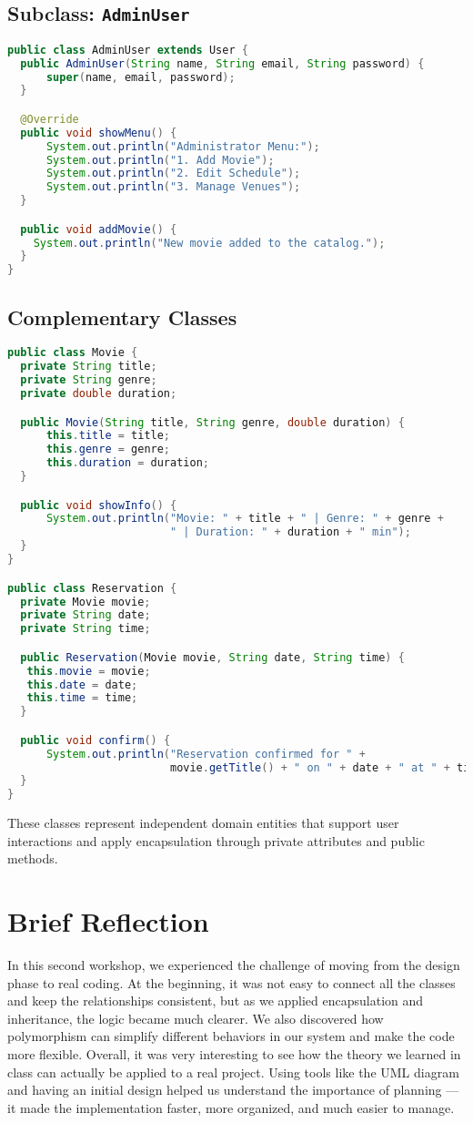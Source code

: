 \documentclass[man]{apa7}
\begin{document}
\subsection{Subclass: \texttt{AdminUser}}
\begin{lstlisting}[language=Java]
public class AdminUser extends User {
  public AdminUser(String name, String email, String password) {
      super(name, email, password);
  }

  @Override
  public void showMenu() {
      System.out.println("Administrator Menu:");
      System.out.println("1. Add Movie");
      System.out.println("2. Edit Schedule");
      System.out.println("3. Manage Venues");
  }

  public void addMovie() {
    System.out.println("New movie added to the catalog.");
  }
}
\end{lstlisting}

\subsection{Complementary Classes}
\begin{lstlisting}[language=Java]
public class Movie {
  private String title;
  private String genre;
  private double duration;

  public Movie(String title, String genre, double duration) {
      this.title = title;
      this.genre = genre;
      this.duration = duration;
  }

  public void showInfo() {
      System.out.println("Movie: " + title + " | Genre: " + genre + 
                         " | Duration: " + duration + " min");
  }
}

public class Reservation {
  private Movie movie;
  private String date;
  private String time;

  public Reservation(Movie movie, String date, String time) {
   this.movie = movie;
   this.date = date;
   this.time = time;
  }

  public void confirm() {
      System.out.println("Reservation confirmed for " + 
                         movie.getTitle() + " on " + date + " at " + time);
  }
}
\end{lstlisting}

These classes represent independent domain entities that support user interactions and apply encapsulation through private attributes and public methods.

\section{Brief Reflection}
In this second workshop, we experienced the challenge of moving from the design phase to real coding.
At the beginning, it was not easy to connect all the classes and keep the relationships consistent, but as we applied encapsulation and inheritance, the logic became much clearer.
We also discovered how polymorphism can simplify different behaviors in our system and make the code more flexible.
Overall, it was very interesting to see how the theory we learned in class can actually be applied to a real project.
Using tools like the UML diagram and having an initial design helped us understand the importance of planning — it made the implementation faster, more organized, and much easier to manage.
\end{document}
